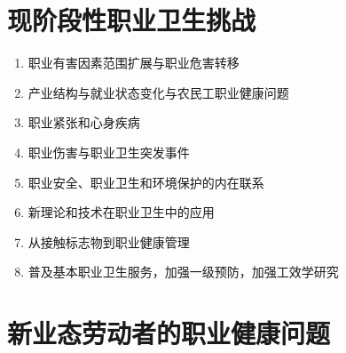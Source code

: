 \section{现阶段性职业卫生挑战}

\begin{enumerate}[leftmargin=*]
    \item 职业有害因素范围扩展与职业危害转移
    \item 产业结构与就业状态变化与农民工职业健康问题
    \item 职业紧张和心身疾病
    \item 职业伤害与职业卫生突发事件
    \item 职业安全、职业卫生和环境保护的内在联系
    \item 新理论和技术在职业卫生中的应用
    \item 从接触标志物到职业健康管理
    \item 普及基本职业卫生服务，加强一级预防，加强工效学研究
\end{enumerate}

\section{新业态劳动者的职业健康问题}

